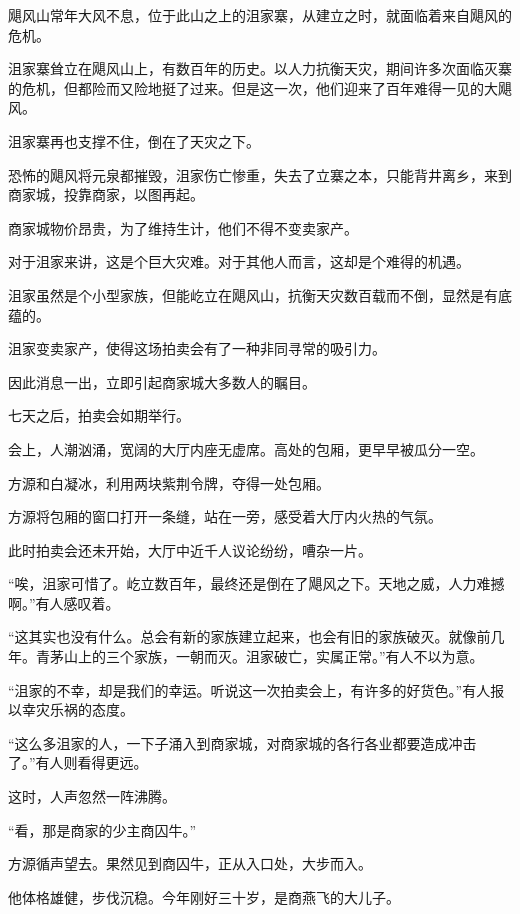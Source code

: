
\begin{this_body}

飓风山常年大风不息，位于此山之上的沮家寨，从建立之时，就面临着来自飓风的危机。

沮家寨耸立在飓风山上，有数百年的历史。以人力抗衡天灾，期间许多次面临灭寨的危机，但都险而又险地挺了过来。但是这一次，他们迎来了百年难得一见的大飓风。

沮家寨再也支撑不住，倒在了天灾之下。

恐怖的飓风将元泉都摧毁，沮家伤亡惨重，失去了立寨之本，只能背井离乡，来到商家城，投靠商家，以图再起。

商家城物价昂贵，为了维持生计，他们不得不变卖家产。

对于沮家来讲，这是个巨大灾难。对于其他人而言，这却是个难得的机遇。

沮家虽然是个小型家族，但能屹立在飓风山，抗衡天灾数百载而不倒，显然是有底蕴的。

沮家变卖家产，使得这场拍卖会有了一种非同寻常的吸引力。

因此消息一出，立即引起商家城大多数人的瞩目。

七天之后，拍卖会如期举行。

会上，人潮汹涌，宽阔的大厅内座无虚席。高处的包厢，更早早被瓜分一空。

方源和白凝冰，利用两块紫荆令牌，夺得一处包厢。

方源将包厢的窗口打开一条缝，站在一旁，感受着大厅内火热的气氛。

此时拍卖会还未开始，大厅中近千人议论纷纷，嘈杂一片。

“唉，沮家可惜了。屹立数百年，最终还是倒在了飓风之下。天地之威，人力难撼啊。”有人感叹着。

“这其实也没有什么。总会有新的家族建立起来，也会有旧的家族破灭。就像前几年。青茅山上的三个家族，一朝而灭。沮家破亡，实属正常。”有人不以为意。

“沮家的不幸，却是我们的幸运。听说这一次拍卖会上，有许多的好货色。”有人报以幸灾乐祸的态度。

“这么多沮家的人，一下子涌入到商家城，对商家城的各行各业都要造成冲击了。”有人则看得更远。

这时，人声忽然一阵沸腾。

“看，那是商家的少主商囚牛。”

方源循声望去。果然见到商囚牛，正从入口处，大步而入。

他体格雄健，步伐沉稳。今年刚好三十岁，是商燕飞的大儿子。


\end{this_body}
